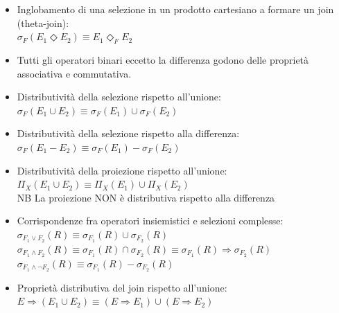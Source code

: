 \documentclass[../main.tex]{subfiles}
\begin{document}
\begin{itemize}
		\item Inglobamento di una selezione in un prodotto cartesiano a formare un join (theta-join):\\
		$\sigma_F (E_1 \Diamond E_2 ) \equiv E_1 \Diamond_F E_2$
		\item Tutti gli operatori binari eccetto la differenza godono delle proprietà associativa e commutativa.
		\item Distributività della selezione rispetto all'unione:\\
		$\sigma_F (E_1 \cup E_2) \equiv \sigma_F (E_1) \cup \sigma_F (E_2)$
		\item Distributività della selezione rispetto alla differenza:\\
		$\sigma_F (E_1 - E_2) \equiv \sigma_F (E_1) - \sigma_F (E_2)$
		\item Distributività della proiezione rispetto all'unione:\\
		$\Pi_{X} (E_1 \cup E_2) \equiv \Pi_{X} (E_1) \cup \Pi_{X} (E_2)$\\
		{ \color{red} NB La proiezione NON è distributiva rispetto alla differenza}
		\item Corrispondenze fra operatori insiemistici e selezioni complesse:\\
		$\sigma_{F_1 \vee F_2} (R) \equiv \sigma_{F_1} (R) \cup \sigma_{F_2} (R)$\\
		$\sigma_{F_1 \wedge F_2} (R) \equiv \sigma_{F_1} (R) \cap \sigma_{F_2} (R) \equiv \sigma_{F_1} (R) \Rightarrow \sigma_{F_2} (R)$\\
		$\sigma_{F_1 \wedge \neg F_2} (R) \equiv \sigma_{F_1} (R) - \sigma_{F_2} (R)$
		\item Proprietà distributiva del join rispetto all'unione:\\
		$E \Rightarrow (E_1 \cup E_2) \equiv (E \Rightarrow E_1) \cup (E \Rightarrow E_2)$
	\end{itemize}
\end{document}
